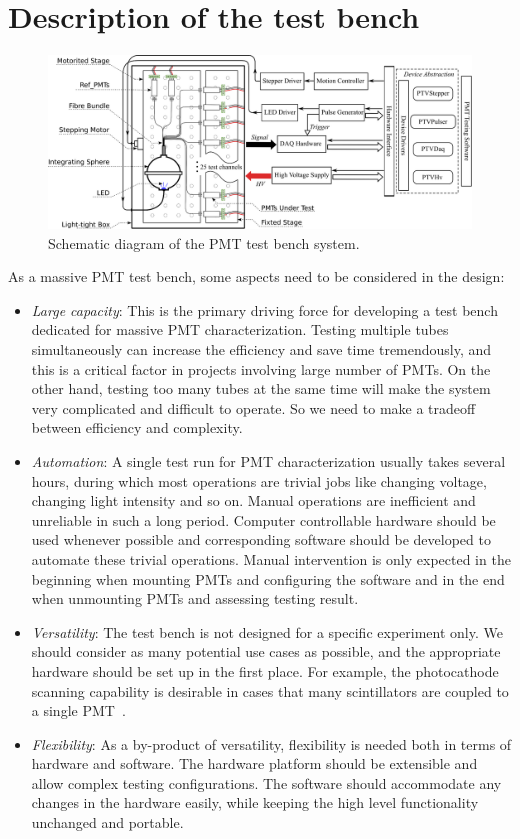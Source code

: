 \documentclass[review, times]{elsarticle}
\begin{document}
\section{Description of the test bench}
\label{sec:description}

\begin{figure}
 \centering
 \includegraphics[width=140mm]{FIG1}
\caption{Schematic diagram of the PMT test bench system.}
\label{fig:FIG1}
\end{figure}

As a massive PMT test bench, some aspects need to be considered in the design:
\begin{itemize}
 \item \textit{Large capacity}: This is the primary driving force for developing a test bench dedicated for massive PMT characterization.
 Testing multiple tubes simultaneously can increase the efficiency and save time tremendously, and this is a critical factor in projects involving large number of PMTs. 
 On the other hand, testing too many tubes at the same time will make the system very complicated and difficult to operate. 
 So we need to make a tradeoff between efficiency and complexity.
 \item \textit{Automation}: A single test run for PMT characterization usually takes several hours, during which most operations are trivial jobs like changing voltage, changing light intensity and so on.
 Manual operations are inefficient and unreliable in such a long period.
 Computer controllable hardware should be used whenever possible and corresponding software should be developed to automate these trivial operations.
 Manual intervention is only expected in the beginning when mounting PMTs and configuring the software and in the end when unmounting PMTs and assessing testing result. 
 \item \textit{Versatility}: The test bench is not designed for a specific experiment only. 
 We should consider as many potential use cases as possible, and the appropriate hardware should be set up in the first place.
 For example, the photocathode scanning capability is desirable in cases that many scintillators are coupled to a single PMT~\cite{tof_pet}. 
 \item \textit{Flexibility}: As a by-product of versatility, flexibility is needed both in terms of hardware and software.
 The hardware platform should be extensible and allow complex testing configurations.
 The software should accommodate any changes in the hardware easily, while keeping the high level functionality unchanged and portable. 
\end{itemize}
\end{document}
